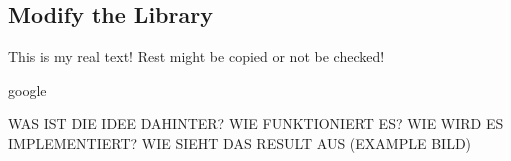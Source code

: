 \subsection{Modify the Library} \label{subsection:counter-modifications-library}
This is my real text! Rest might be copied or not be checked!


google

WAS IST DIE IDEE DAHINTER? WIE FUNKTIONIERT ES? WIE WIRD ES IMPLEMENTIERT? WIE SIEHT DAS RESULT AUS (EXAMPLE BILD)\newline

